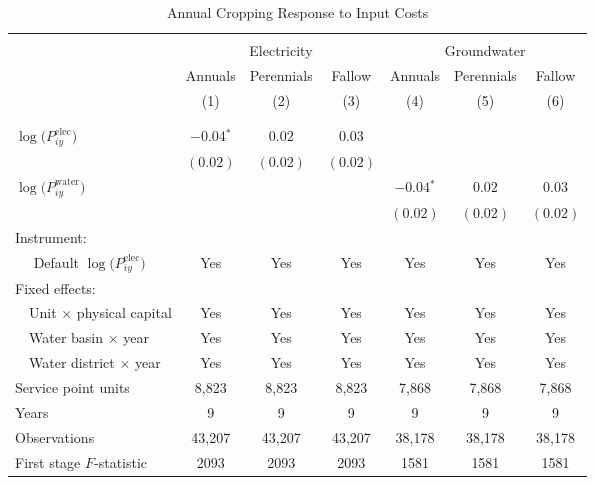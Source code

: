 \begin{table}[t!]\centering
\small
\caption{Annual Cropping Response to Input Costs \label{tab:ann_regs_crop}}
\vspace{-0.1cm}
\small
\begin{adjustbox}{center} 
\begin{tabular}{lcccccc} 
\hline \hline
\vspace{-0.37cm}
\\
 & \multicolumn{3}{c}{Electricity} & \multicolumn{3}{c}{Groundwater} \\
 \cmidrule(r){2-4} \cmidrule(l){5-7}
 & Annuals & Perennials & Fallow & Annuals & Perennials & Fallow \\
[0.1em]
 & (1)  & (2)  & (3)  & (4)  & (5)  & (6) \\ 
\vspace{-0.37cm}
\\
\cline{2-7}
\vspace{-0.27cm}
\\
 $\log\big(P^{\text{elec}}_{iy}\big)$ ~ & $-0.04$$^{*}$  & $0.02$ & $0.03$ &  &  &  \\ 
& $(0.02)$ & $(0.02)$ & $(0.02)$ &  &  &  \\
[0.1em] 
 $\log\big(P^{\text{water}}_{iy}\big)$ ~ &  &  &  & $-0.04$$^{*}$ & $0.02$  & $0.03$ \\ 
&  &  &  & $(0.02)$ & $(0.02)$ & $(0.02)$ \\
[1.5em] 
Instrument: \\
[0.1em] 
~~ Default $\log\big(P^{\text{elec}}_{iy}\big)$  & Yes & Yes & Yes  & Yes  & Yes & Yes \\
[1.5em] 
Fixed effects: \\
[0.1em] 
~~Unit $\times$ physical capital & Yes & Yes & Yes & Yes & Yes & Yes  \\
[0.1em] 
~~Water basin $\times$ year & Yes & Yes & Yes & Yes & Yes & Yes \\
[0.1em] 
~~Water district $\times$ year & Yes & Yes & Yes & Yes & Yes & Yes \\
[1.5em] 
Service point units & 8,823 & 8,823 & 8,823 & 7,868 & 7,868 & 7,868  \\ 
[0.1em] 
Years  & 9 & 9 & 9 & 9 & 9 & 9 \\ 
[0.1em] 
Observations & 43,207 & 43,207 & 43,207 & 38,178 & 38,178 & 38,178 \\ 
[0.1em] 
First stage $F$-statistic & 2093 & 2093 & 2093 & 1581 & 1581 & 1581 \\ 
[0.15em]
\hline
\end{tabular}

\end{adjustbox}
\end{table}
